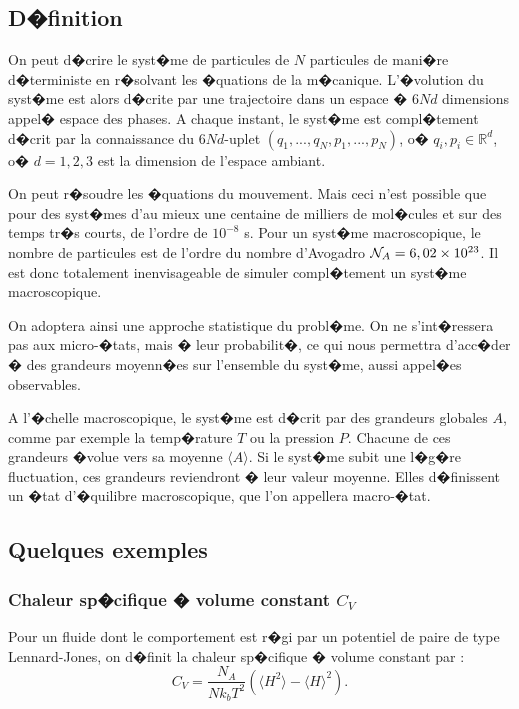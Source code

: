 \documentclass[a4paper,10pt,twoside]{report}
\begin{document}
\subsection{D�finition}

On peut d�crire le syst�me de particules de $N$ particules de mani�re
d�terministe en r�solvant les �quations de la m�canique. L'�volution
du syst�me est alors d�crite par une trajectoire dans un espace �
$6Nd$ dimensions appel� espace des phases. A chaque instant, le
syst�me est compl�tement d�crit par la connaissance du $6Nd$-uplet
$(q_1,...,q_N,p_1,...,p_N)$, o� $q_i, p_i \in \mathbb{R}^d$, o�
$d=1,2,3$ est la dimension de l'espace ambiant.

On peut r�soudre les �quations du mouvement. Mais ceci n'est possible
que pour des syst�mes d'au mieux une centaine de milliers de mol�cules
et sur des temps tr�s courts, de l'ordre de $10^{-8}$ s. Pour un
syst�me macroscopique, le nombre de particules est de l'ordre du
nombre d'Avogadro ${\cal N}_A=6,02 \times 10^{23}$. Il est donc totalement
inenvisageable de simuler compl�tement un syst�me macroscopique.

On adoptera ainsi une approche statistique du probl�me. On ne
s'int�ressera pas aux micro-�tats, mais � leur probabilit�, ce qui
nous permettra d'acc�der � des grandeurs moyenn�es sur l'ensemble du
syst�me, aussi appel�es observables.

A l'�chelle macroscopique, le syst�me est d�crit par des grandeurs
globales $A$, comme par exemple la temp�rature $T$ ou la pression
$P$. Chacune de ces grandeurs �volue vers sa moyenne $\langle A
\rangle$. Si le syst�me subit une l�g�re fluctuation, ces grandeurs
reviendront � leur valeur moyenne. Elles d�finissent un �tat
d'�quilibre macroscopique, que l'on appellera macro-�tat.

\subsection{Quelques exemples}

\subsubsection{Chaleur sp�cifique � volume constant $C_V$}

Pour un fluide dont le comportement est r�gi par un potentiel de paire
de type Lennard-Jones, on d�finit la chaleur sp�cifique � volume
constant par :
\[
C_V = \frac{N_A}{Nk_{b}T^{2}}(\langle H^2 \rangle - \langle H \rangle ^2).
\]
\end{document}
